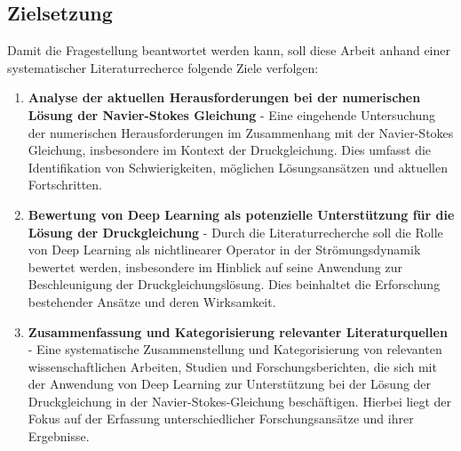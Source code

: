 \subsection{Zielsetzung}
Damit die Fragestellung beantwortet werden kann, soll diese Arbeit anhand einer systematischer Literaturrecherce folgende Ziele verfolgen:

\begin{enumerate}
    \item \textbf{Analyse der aktuellen Herausforderungen bei der numerischen Lösung der Navier-Stokes Gleichung} - Eine eingehende Untersuchung der numerischen Herausforderungen im Zusammenhang mit der Navier-Stokes Gleichung, insbesondere im Kontext der Druckgleichung. Dies umfasst die Identifikation von Schwierigkeiten, möglichen Lösungsansätzen und aktuellen Fortschritten.
    \item \textbf{Bewertung von Deep Learning als potenzielle Unterstützung für die Lösung der Druckgleichung} - Durch die Literaturrecherche soll die Rolle von Deep Learning als nichtlinearer Operator in der Strömungsdynamik bewertet werden, insbesondere im Hinblick auf seine Anwendung zur Beschleunigung der Druckgleichungslösung. Dies beinhaltet die Erforschung bestehender Ansätze und deren Wirksamkeit.
    \item \textbf{Zusammenfassung und Kategorisierung relevanter Literaturquellen} - Eine systematische Zusammenstellung und Kategorisierung von relevanten wissenschaftlichen Arbeiten, Studien und Forschungsberichten, die sich mit der Anwendung von Deep Learning zur Unterstützung bei der Lösung der Druckgleichung in der Navier-Stokes-Gleichung beschäftigen. Hierbei liegt der Fokus auf der Erfassung unterschiedlicher Forschungsansätze und ihrer Ergebnisse.
\end{enumerate}